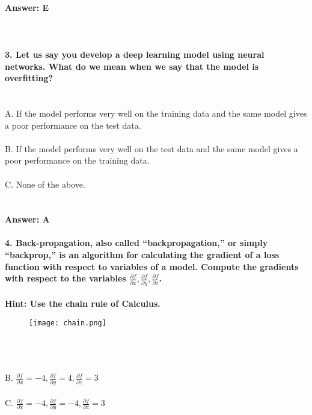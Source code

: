 \documentclass[prl,twocolumn,showpacs,preprintnumbers,superscriptaddress]{revtex4}
\theoremstyle{plain}
\theoremstyle{definition}
\begin{document}
\begin{widetext}
\\
\textbf{Answer: E}
\\
\\
\\
\\
\textbf{3. Let us say you develop a deep learning model using neural networks. What do we mean when we say that the model is overfitting?}
\\
\\
\\
A. If the model performs very well on the training data and the same model gives a poor performance on the test data.
\\
\\
B. If the model performs very well on the test data and the same model gives a poor performance on the training data.
\\
\\
C. None of the above.
\\
\\
\\
\textbf{Answer: A}
\\
\\
\textbf{4. Back-propagation, also called “backpropagation,” or simply “backprop,” is an algorithm for calculating the gradient of a loss function with respect to variables of a model. Compute the gradients with respect to the variables 
$\frac{\partial f}{\partial x}, \frac{\partial f}{\partial y}, \frac{\partial f}{\partial z}$. \\ \\
Hint: Use the chain rule of Calculus.}
\\
\begin{figure}[H]
\begin{center}
    \texttt{[image: chain.png]}
\end{center}
\end{figure}
\\
\\
\\
B. $\frac{\partial f}{\partial x} = -4, \frac{\partial f}{\partial y} = 4, \frac{\partial f}{\partial z} = 3$
\\
\\
C. $\frac{\partial f}{\partial x} = -4, \frac{\partial f}{\partial y} = -4, \frac{\partial f}{\partial z} = 3$
\\
\\

\end{widetext}
\end{document}
